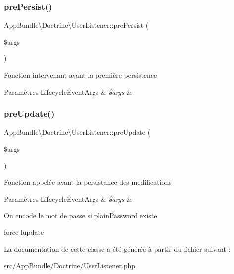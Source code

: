 \subsubsection{\texorpdfstring{pre\+Persist()}{prePersist()}}
{\footnotesize\ttfamily App\+Bundle\textbackslash{}\+Doctrine\textbackslash{}\+User\+Listener\+::pre\+Persist (\begin{DoxyParamCaption}\item[{Lifecycle\+Event\+Args}]{\$args }\end{DoxyParamCaption})}

Fonction intervenant avant la première persistence


\begin{DoxyParams}[1]{Paramètres}
Lifecycle\+Event\+Args & {\em \$args} & \\
\hline
\end{DoxyParams}
\mbox{\label{classAppBundle_1_1Doctrine_1_1UserListener_a05c3f700be2b3d36f27a26d46f2e9845}} 
\subsubsection{\texorpdfstring{pre\+Update()}{preUpdate()}}
{\footnotesize\ttfamily App\+Bundle\textbackslash{}\+Doctrine\textbackslash{}\+User\+Listener\+::pre\+Update (\begin{DoxyParamCaption}\item[{Lifecycle\+Event\+Args}]{\$args }\end{DoxyParamCaption})}

Fonction appelée avant la persistance des modifications


\begin{DoxyParams}[1]{Paramètres}
Lifecycle\+Event\+Args & {\em \$args} & \\
\hline
\end{DoxyParams}
On encode le mot de passe si plain\+Password existe

force l\textquotesingle{}update

La documentation de cette classe a été générée à partir du fichier suivant \+:\begin{DoxyCompactItemize}
\item 
src/\+App\+Bundle/\+Doctrine/User\+Listener.\+php\end{DoxyCompactItemize}
